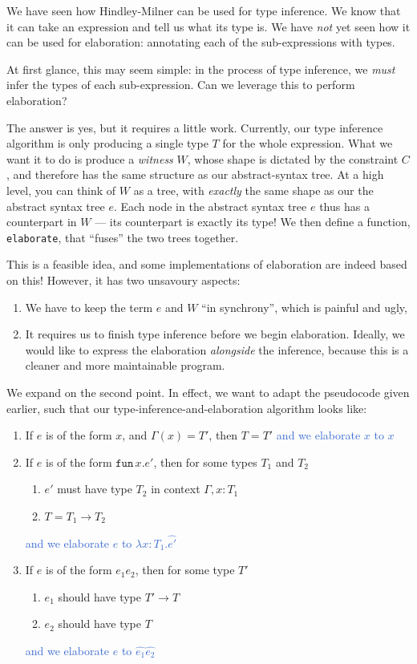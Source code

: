 {We have seen how Hindley-Milner can be used for type inference. We know that it can take an expression and tell us what its type is. We have \textit{not} yet seen how it can be used for elaboration: annotating each of the sub-expressions with types. 

At first glance, this may seem simple: in the process of type inference, we \textit{must} infer the types of each sub-expression. Can we leverage this to perform elaboration?

The answer is yes, but it requires a little work. Currently, our type inference algorithm is only producing a single type $T$ for the whole expression. What we want it to do is produce a \textit{witness} $W$, whose shape is dictated by the constraint $C$, and therefore has the same structure as our abstract-syntax tree. At a high level, you can think of $W$ as a tree, with \textit{exactly} the same shape as our the abstract syntax tree $e$. Each node in the abstract syntax tree $e$ thus has a counterpart in $W$ --- its counterpart is exactly its type! We then define a function, \texttt{elaborate}, that ``fuses'' the two trees together.

This is a feasible idea, and some implementations of elaboration are indeed based on this! However, it has two unsavoury aspects:
\begin{enumerate}
    \item We have to keep the term $e$ and $W$ ``in synchrony'', which is painful and ugly,
    \item It requires us to finish type inference before we begin elaboration. Ideally, we would like to express the elaboration \textit{alongside} the inference, because this is a cleaner and more maintainable program.
\end{enumerate}

We expand on the second point. In effect, we want to adapt the pseudocode given earlier, such that our type-inference-and-elaboration algorithm looks like:

\begin{enumerate}
    \item If $e$ is of the form $x$, and $\Gamma(x) = T'$, then $T = T'$ \textcolor{highlight}{and we elaborate $x$ to $x$}
    \item If $e$ is of the form $\texttt{fun} \, x. e'$, then for some types $T_1$ and $T_2$
    \begin{enumerate}
        \item $e'$ must have type $T_2$ in context $\Gamma, x: T_1$ 
        \item $T = T_1 \to T_2$
    \end{enumerate}
    \textcolor{highlight}{and we elaborate $e$ to $\lambda x: T_1 . \hat{e'}$}
    \item If $e$ is of the form $e_1 e_2$, then for some type $T'$
    \begin{enumerate}
        \item $e_1$ should have type $T' \to T$
        \item $e_2$ should have type $T$
    \end{enumerate}
    \textcolor{highlight}{and we elaborate $e$ to $\hat{e_1} \hat{e_2}$}
\end{enumerate}

}
